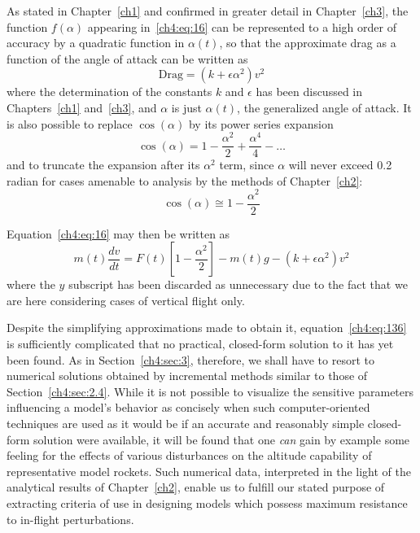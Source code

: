 As stated in Chapter~\ref{ch1} and confirmed in greater detail in Chapter~\ref{ch3}, the function
$f(\alpha)$ appearing in~\eqref{ch4:eq:16} can be represented to a high order of accuracy by a
quadratic function in $\alpha(t)$, so that the approximate drag as a function of the angle of
attack can be written as
\begin{equation}\label{ch4:eq:133}
\text{Drag} = (k + \epsilon\alpha^{2})v^{2}
\end{equation}
where the determination of the constants $k$ and $\epsilon$ has been discussed in
Chapters~\ref{ch1} and~\ref{ch3}, and $\alpha$ is just $\alpha(t)$, the generalized angle of
attack. It is also possible to replace $\cos(\alpha)$ by its power series
expansion
\begin{equation}\label{ch4:eq:134}
\cos(\alpha) = 1 - \frac{\alpha^{2}}{2} + \frac{\alpha^{4}}{4} - \ldots
\end{equation}
and to truncate the expansion after its $\alpha^{2}$ term, since $\alpha$ will never exceed 0.2
radian for cases amenable to analysis by the methods of Chapter~\ref{ch2}:
\begin{equation}\label{ch4:eq:135}
\cos(\alpha) \cong 1 - \frac{\alpha^{2}}{2}
\end{equation}

Equation~\eqref{ch4:eq:16} may then be written as
\begin{equation}\label{ch4:eq:136}
m(t)\frac{dv}{dt} = F(t)\left[1 - \frac{\alpha^{2}}{2}\right] - m(t)g - (k + \epsilon\alpha^{2})v^{2}
\end{equation}
where the $y$ subscript has been discarded as unnecessary due to the fact that we are here
considering cases of vertical flight only.

Despite the simplifying approximations made to obtain it, equation~\eqref{ch4:eq:136} is
sufficiently complicated that no practical, closed-form solution to it has yet been found. As in
Section~\ref{ch4:sec:3}, therefore, we shall have to resort to numerical solutions obtained by
incremental methods similar to those of Section~\ref{ch4:sec:2.4}. While it is not possible to
visualize the sensitive parameters influencing a model's behavior as concisely when such
computer-oriented techniques are used as it would be if an accurate and reasonably simple
closed-form solution were available, it will be found that one \emph{can} gain by example some
feeling for the effects of various disturbances on the altitude capability of representative model
rockets. Such numerical data, interpreted in the light of the analytical results of
Chapter~\ref{ch2}, enable us to fulfill our stated purpose of extracting criteria of use in
designing models which possess maximum resistance to in-flight perturbations.

